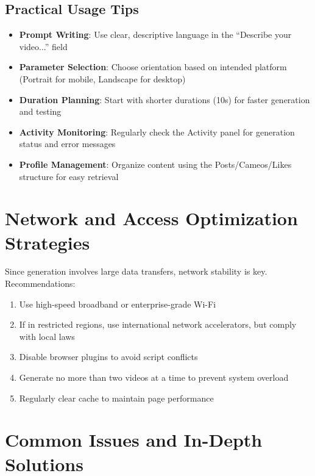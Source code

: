 \subsection{Practical Usage Tips}

\begin{itemize}
\item \textbf{Prompt Writing}: Use clear, descriptive language in the ``Describe your video...'' field
\item \textbf{Parameter Selection}: Choose orientation based on intended platform (Portrait for mobile, Landscape for desktop)
\item \textbf{Duration Planning}: Start with shorter durations (10s) for faster generation and testing
\item \textbf{Activity Monitoring}: Regularly check the Activity panel for generation status and error messages
\item \textbf{Profile Management}: Organize content using the Posts/Cameos/Likes structure for easy retrieval
\end{itemize}

\section{Network and Access Optimization Strategies}

Since generation involves large data transfers, network stability is key. Recommendations:

\begin{enumerate}
\item Use high-speed broadband or enterprise-grade Wi-Fi
\item If in restricted regions, use international network accelerators, but comply with local laws
\item Disable browser plugins to avoid script conflicts
\item Generate no more than two videos at a time to prevent system overload
\item Regularly clear cache to maintain page performance
\end{enumerate}

\section{Common Issues and In-Depth Solutions}


